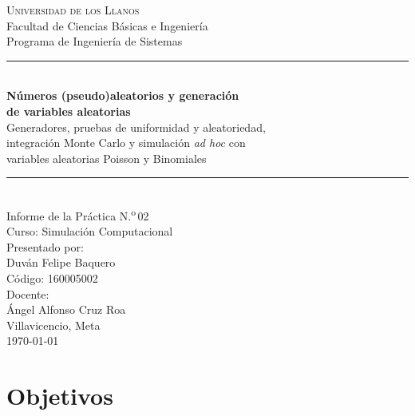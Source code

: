 \documentclass[11pt,letterpaper]{article}
\newcommand{\nombreEstudiante}{Duván Felipe Baquero}
\newcommand{\codigoEstudiante}{160005002}
\newcommand{\nombreDocente}{Ángel Alfonso Cruz Roa}
\begin{document}
\begin{titlepage}
\thispagestyle{empty}
\centering
\vspace*{\fill}

{\large \textsc{Universidad de los Llanos}}\\[0.2cm]
{\normalsize Facultad de Ciencias Básicas e Ingeniería}\\
{\normalsize Programa de Ingeniería de Sistemas}\\[1.6cm]

\rule{\textwidth}{0.8pt}\\[0.5cm]
{\LARGE \textbf{Números (pseudo)aleatorios y generación\\ de variables aleatorias}}\\[0.35cm]
{\large Generadores, pruebas de uniformidad y aleatoriedad,\\
integración Monte Carlo y simulación \emph{ad hoc} con\\
variables aleatorias Poisson y Binomiales}\\[0.5cm]
\rule{\textwidth}{0.8pt}\\[1.6cm]

{\normalsize Informe de la Práctica N.\textsuperscript{o}\,02}\\
{\normalsize Curso: Simulación Computacional}\\[1.4cm]

{\normalsize Presentado por:}\\[0.15cm]
{\large \nombreEstudiante}\\
{\normalsize Código: \codigoEstudiante}\\[1.2cm]

{\normalsize Docente:}\\[0.15cm]
{\large \nombreDocente}\\[1.6cm]

{\normalsize Villavicencio, Meta \\ \today}

\vspace*{\fill}
\end{titlepage}

\newpage
\tableofcontents
\newpage

\section{Objetivos}
\end{document}
